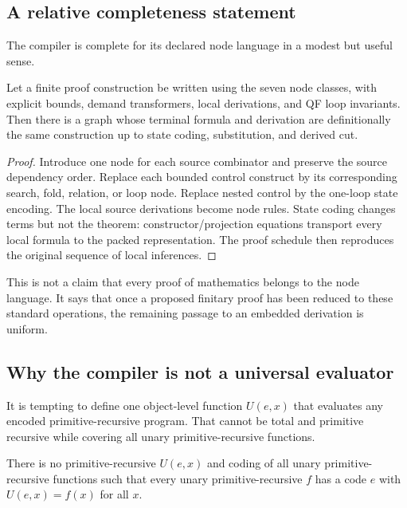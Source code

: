 \subsection{A relative completeness statement}

The compiler is complete for its declared node language in a modest but useful sense.

\begin{proposition}
Let a finite proof construction be written using the seven node classes, with explicit bounds, demand transformers, local derivations, and QF loop invariants.  Then there is a \KIFCR graph whose terminal formula and derivation are definitionally the same construction up to state coding, substitution, and derived cut.
\end{proposition}

\begin{proof}
Introduce one node for each source combinator and preserve the source dependency order.  Replace each bounded control construct by its corresponding search, fold, relation, or loop node.  Replace nested control by the one-loop state encoding.  The local source derivations become node rules.  State coding changes terms but not the theorem: constructor/projection equations transport every local formula to the packed representation.  The proof schedule then reproduces the original sequence of local inferences.
\end{proof}

This is not a claim that every proof of mathematics belongs to the node language.  It says that once a proposed finitary proof has been reduced to these standard operations, the remaining passage to an embedded derivation is uniform.

\subsection{Why the compiler is not a universal evaluator}

It is tempting to define one object-level function \(U(e,x)\) that evaluates any encoded primitive-recursive program.  That cannot be total and primitive recursive while covering all unary primitive-recursive functions.

\begin{barrier}\label{barrier:universal}
There is no primitive-recursive \(U(e,x)\) and coding of all unary primitive-recursive functions such that every unary primitive-recursive \(f\) has a code \(e\) with \(U(e,x)=f(x)\) for all \(x\).
\end{barrier}

